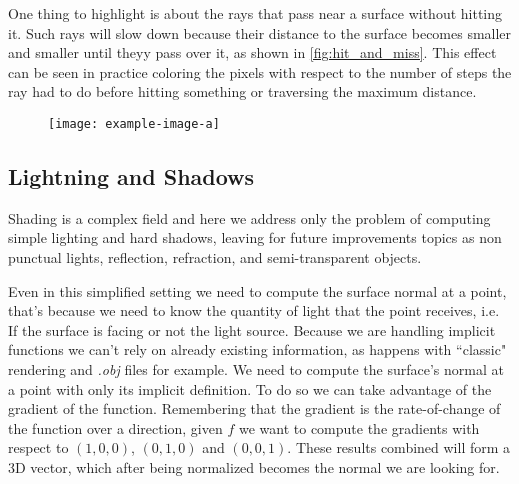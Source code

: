 One thing to highlight is about the rays that pass near a surface without hitting it.
Such rays will slow down because their distance to the surface becomes smaller and smaller until theyy pass over it, as shown in \autoref{fig:hit_and_miss}.
This effect can be seen in practice coloring the pixels with respect to the number of steps the ray had to do before hitting something or traversing the maximum distance.

\begin{figure}[!htb]
  \centering
  \texttt{[image: example-image-a]}
\end{figure}






\subsection{Lightning and Shadows}



Shading is a complex field and here we address only the problem of computing simple lighting and hard shadows, leaving for future improvements topics as non punctual lights, reflection, refraction, and semi-transparent objects.

Even in this simplified setting we need to compute the surface normal at a point, 
that's because we need to know the quantity of light that the point receives, i.e. If the surface is facing or not the light source.
Because we are handling implicit functions we can't rely on already existing information, as happens with ``classic" rendering and \emph{.obj} files for example.
We need to compute the surface's normal at a point with only its implicit definition.
To do so we can take advantage of the gradient of the function.
Remembering that the gradient is the rate-of-change of the function over a direction, given $f$ we want to compute the gradients with respect to $(1,0,0)$, $(0,1,0)$ and $(0,0,1)$.
These results combined will form a 3D vector, which after being normalized becomes the normal we are looking for.

